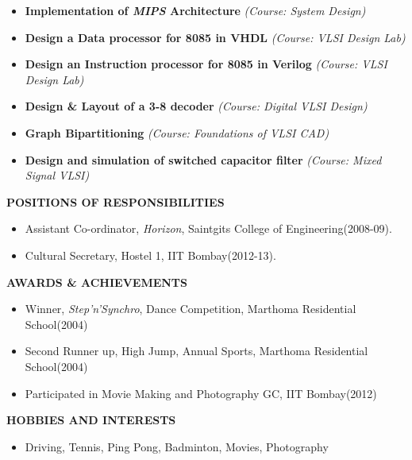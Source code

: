 \documentclass[a4paper,10pt]{article}
\begin{document}
 \begin{itemize}
  \setlength{\itemsep}{1pt}
  \item \textbf{{Implementation of \textit{MIPS} Architecture}} \textit{(Course: System Design)}
  \item \textbf{{Design a Data processor for 8085 in VHDL}} \textit{(Course: VLSI Design Lab)}
  \item \textbf{{Design an Instruction processor for 8085 in Verilog}} \textit{(Course: VLSI Design Lab)}
  \item \textbf{{Design \& Layout of a 3-8 decoder}}   \textit{(Course: Digital VLSI Design)}
  \item \textbf{{Graph Bipartitioning}} \textit{(Course: Foundations of VLSI CAD)}
  \item \textbf{{Design and simulation of switched capacitor filter}} \textit{(Course: Mixed Signal VLSI)}
 \end{itemize} 
 \colorbox{titleColor}{\parbox{6.5in}{\textbf{POSITIONS OF RESPONSIBILITIES}}}
   \begin{itemize}
    \item Assistant Co-ordinator, \textit{Horizon}, Saintgits College of Engineering(2008-09).
    \item Cultural Secretary, Hostel 1, IIT Bombay(2012-13). %
  \end{itemize}  
 \colorbox{titleColor}{\parbox{6.5in}{\textbf{AWARDS \& ACHIEVEMENTS}}}
  \begin{itemize}
  \item Winner, \textit{Step'n'Synchro}, Dance Competition, Marthoma Residential School(2004)
  \item Second Runner up, High Jump, Annual Sports,  Marthoma Residential School(2004)
  \item Participated in Movie Making and Photography GC, IIT Bombay(2012) 
  \end{itemize} 
 \colorbox{titleColor}{\parbox{6.5in}{\textbf{HOBBIES AND INTERESTS}}}
  \begin{itemize}
   \item Driving, Tennis, Ping Pong, Badminton, Movies, Photography
  \end{itemize}
\end{document}
